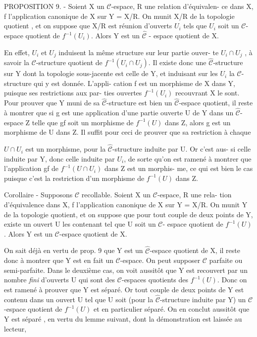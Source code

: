 PROPOSITION 9. - Soient X un $\mathcal{C}$-espace, R une relation d'équivalen-
ce dans X, f l'application canonique de X sur Y = X/R. On munit X/R de
la topologie quotient , et on suppose que X/R est réunion d'ouverts $U_i$
tels que $U_i$ soit un $\mathcal{C}$-espace quotient de $f^{-1}(U_i)$. Alors Y est un $\hat{\mathcal{C}}$ -
espace quotient de X.

En effet, $U_i$ et $U_j$ induisent la même structure sur leur partie ouver-
te $U_i \cap U_j$ , à savoir la $\mathcal{C}$-structure quotient de $f^{-1}(U_i \cap U_j)$. Il existe
donc une $\hat{\mathcal{C}}$-structure sur Y dont la topologie sous-jacente est celle
de Y, et induisant sur les $U_i$ la $\mathcal{C}$-structure qui y est donnée. L'appli-
cation f est un morphisme de X dans Y, puisque ses restrictions aux par-
ties ouvertes $f^{-1}(U_i)$ recouvrant X le sont. Pour prouver que Y muni de
sa $\hat{\mathcal{C}}$-structure est bien un $\hat{\mathcal{C}}$-espace quotient, il reste à montrer que
si g est une application d'une partie ouverte U de Y dans un $\hat{\mathcal{C}}$-espace Z
telle que gf soit un morphisme de $f^{-1}(U)$ dans Z, alors g est un morphisme
de U dans Z. Il suffit pour ceci de prouver que sa restriction à chaque

\newpage



$U \cap U_i$ est un morphisme, pour la $\hat{\mathcal{C}}$-structure induite par U. Or c'est aus-
si celle induite par Y, donc celle induite par $U_i$, de sorte qu'on est
ramené à montrer que l'application gf de $f^{-1}(U \cap U_i)$ dans Z est un morphis-
me, ce qui est bien le cas puisque c'est la restriction d'un morphisme
de $f^{-1}(U)$ dans Z.

Corollaire - Supposons $\mathcal{C}$ recollable. Soient X un $\mathcal{C}$-espace, R une rela-
tion d'équivalence dans X, f l'application canonique de X sur Y = X/R. On
munit Y de la topologie quotient, et on suppose que pour tout couple de
deux points de Y, existe un ouvert U les contenant tel que U soit un $\mathcal{C}$-
espace quotient de $f^{-1}(U)$. Alors Y est un $\mathcal{C}$-espace quotient de X.

On sait déjà en vertu de prop. 9 que Y est un $\hat{\mathcal{C}}$-espace quotient de X,
il reste donc à montrer que Y est en fait un $\mathcal{C}$-espace. On peut supposer
$\mathcal{C}$ parfaite ou semi-parfaite. Dans le deuxième cas, on voit aussitôt que
Y est recouvert par un nombre \emph{fini} d'ouverts U qui sont des $\mathcal{C}$-espaces
quotients des $f^{-1}(U)$. Donc on est ramené à prouver que Y est séparé. Or
tout couple de deux points de Y est contenu dans un ouvert U tel que U
soit (pour la $\hat{\mathcal{C}}$-structure induite par Y) un $\mathcal{C}$-espace quotient de $f^{-1}(U)$
et en particulier séparé. On en conclut aussitôt que Y est séparé , en
vertu du lemme suivant, dont la démonstration est laissée au lecteur,

